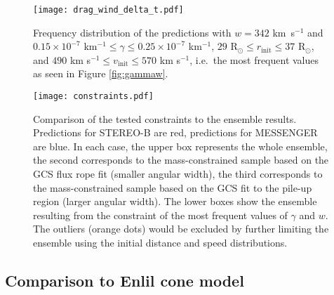 \documentclass[draft]{agujournal}
\begin{document}

 \begin{figure}[h]
 \centering
 \texttt{[image: drag\_wind\_delta\_t.pdf]}
 \caption{Frequency distribution of the predictions with $w=342$ km~s$^{-1}$ and $0.15 \times 10^{-7}$ km$^{-1} \leq \gamma \leq 0.25 \times  10^{-7}$ km$^{-1}$, $29$ R$_\odot \leq r_{\mathrm{init}} \leq 37$ R$_\odot$, and $490$ km s$^{-1} \leq v_{\mathrm{init}} \leq 570$ km s$^{-1}$, i.e.\ the most frequent values as seen in Figure \ref{fig:gammaw}.}
 \label{fig:wgammadt}
 \end{figure}

 \begin{figure}[h]
 \centering
 \texttt{[image: constraints.pdf]}
 \caption{Comparison of the tested constraints to the ensemble results. Predictions for STEREO-B are red, predictions for MESSENGER are blue. In each case, the upper box represents the whole ensemble, the second corresponds to the mass-constrained sample based on the GCS flux rope fit (smaller angular width), the third corresponds to the mass-constrained sample based on the GCS fit to the pile-up region (larger angular width). The lower boxes show the ensemble resulting from the constraint of the most frequent values of $\gamma$ and $w$. The outliers (orange dots) would be excluded by further limiting the ensemble using the initial distance and speed distributions.}
 \label{fig:cons}
 \end{figure}







\subsection{Comparison to Enlil cone model}
\end{document}
